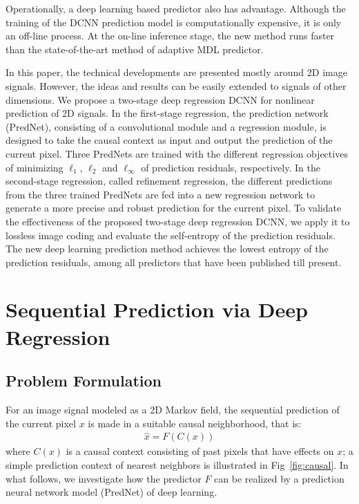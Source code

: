 \documentclass{article}
\begin{document}
Operationally, a deep learning based predictor also has advantage.  Although the training of the DCNN prediction model is computationally expensive, it is only an off-line process.  At the on-line inference stage, the new method runs faster than the state-of-the-art method of adaptive MDL predictor.







In this paper, the technical developments are presented mostly around 2D image signals.
However, the ideas and results can be easily extended to signals of other dimensions.
We propose a two-stage deep regression DCNN for nonlinear prediction of 2D signals.
In the first-stage regression, the prediction network (PredNet), consisting of a convolutional module and a regression module, is designed to take the causal context as input and output the prediction of the current pixel.
Three PredNets are trained with the different regression objectives of minimizing $\ell_1$, $\ell_2$ and $\ell_\infty$ of prediction residuals, respectively.
In the second-stage regression, called refinement regression, the different predictions from the three trained PredNets are fed into a new regression network to generate a more precise and robust prediction for the current pixel.
To validate the effectiveness of the proposed two-stage deep regression DCNN, we apply it to lossless image coding and evaluate the self-entropy of the prediction residuals.  The new deep learning prediction method achieves the lowest entropy of the prediction residuals, among all predictors that have been published till present.



\section{Sequential Prediction via Deep Regression}

\subsection{Problem Formulation}
For an image signal modeled as a 2D Markov field, the sequential prediction of the current pixel $x$ is made in a suitable causal neighborhood, that is:
\begin{align}
	\hat{x} = F(C(x))
\end{align}
where $C(x)$ is a causal context consisting of past pixels that have effects on $x$; a simple prediction context of nearest neighbors is illustrated in Fig~\ref{fig:causal}.  In what follows, we investigate how the predictor $F$ can be realized by a prediction neural network model (PredNet) of deep learning.
\end{document}
